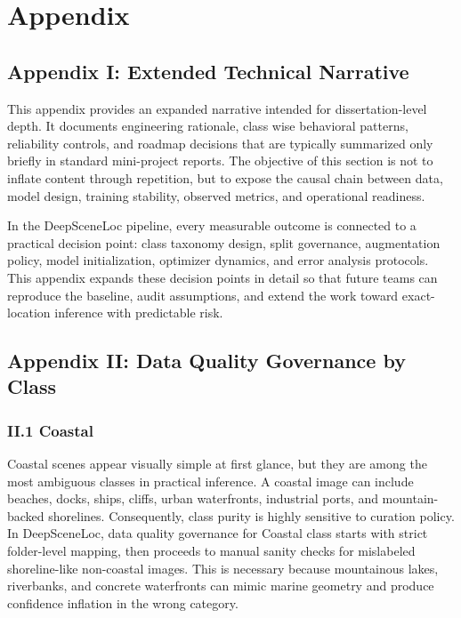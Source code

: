 \chapter*{Appendix}

\section*{Appendix I: Extended Technical Narrative}

This appendix provides an expanded narrative intended for dissertation-level depth. It documents engineering rationale, class wise behavioral patterns, reliability controls, and roadmap decisions that are typically summarized only briefly in standard mini-project reports. The objective of this section is not to inflate content through repetition, but to expose the causal chain between data, model design, training stability, observed metrics, and operational readiness.

In the DeepSceneLoc pipeline, every measurable outcome is connected to a practical decision point: class taxonomy design, split governance, augmentation policy, model initialization, optimizer dynamics, and error analysis protocols. This appendix expands these decision points in detail so that future teams can reproduce the baseline, audit assumptions, and extend the work toward exact-location inference with predictable risk.

\section*{Appendix II: Data Quality Governance by Class}

\subsection*{II.1 Coastal}
Coastal scenes appear visually simple at first glance, but they are among the most ambiguous classes in practical inference. A coastal image can include beaches, docks, ships, cliffs, urban waterfronts, industrial ports, and mountain-backed shorelines. Consequently, class purity is highly sensitive to curation policy. In DeepSceneLoc, data quality governance for Coastal class starts with strict folder-level mapping, then proceeds to manual sanity checks for mislabeled shoreline-like non-coastal images. This is necessary because mountainous lakes, riverbanks, and concrete waterfronts can mimic marine geometry and produce confidence inflation in the wrong category.

